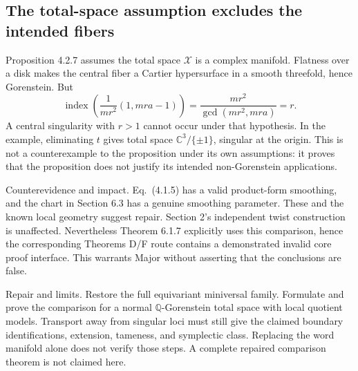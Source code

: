 \documentclass[10pt]{article}
\begin{document}
\subsection*{The total-space assumption excludes the intended fibers}
Proposition 4.2.7 assumes the total space \(\mathcal X\) is a complex manifold. Flatness over a disk makes the central fiber a Cartier hypersurface in a smooth threefold, hence Gorenstein. But \[\operatorname{index}\left(\frac1{mr^2}(1,mra-1)\right)
=\frac{mr^2}{\gcd(mr^2,mra)}=r.\] A central singularity with \(r>1\) cannot occur under that hypothesis. In the example, eliminating \(t\) gives total space \(\mathbb C^3/\{\pm1\}\), singular at the origin. This is not a counterexample to the proposition under its own assumptions: it proves that the proposition does not justify its intended non-Gorenstein applications.\par
Counterevidence and impact. Eq. (4.1.5) has a valid product-form smoothing, and the chart in Section 6.3 has a genuine smoothing parameter. These and the known local geometry suggest repair. Section 2’s independent twist construction is unaffected. Nevertheless Theorem 6.1.7 explicitly uses this comparison, hence the corresponding Theorems D/F route contains a demonstrated invalid core proof interface. This warrants Major without asserting that the conclusions are false.\par
Repair and limits. Restore the full equivariant miniversal family. Formulate and prove the comparison for a normal \(\mathbb Q\)-Gorenstein total space with local quotient models. Transport away from singular loci must still give the claimed boundary identifications, extension, tameness, and symplectic class. Replacing the word manifold alone does not verify those steps. A complete repaired comparison theorem is not claimed here.\par
\end{document}

